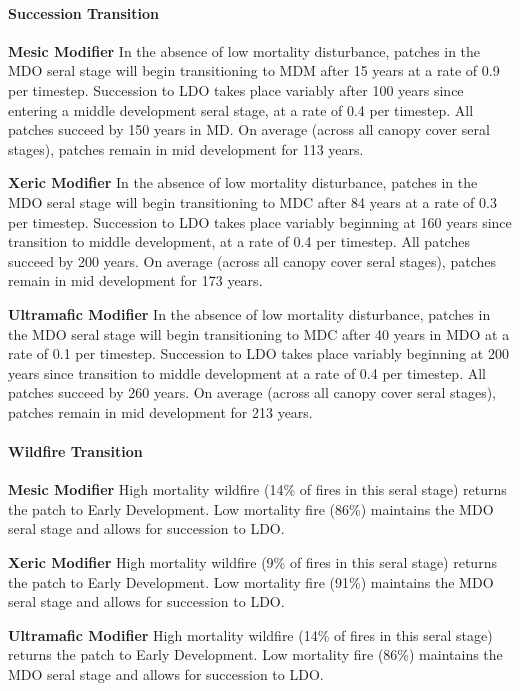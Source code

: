 \paragraph{Succession Transition}
\begin{adjustwidth}{2cm}{}
\textbf{Mesic Modifier } In the absence of low mortality disturbance, patches in the MDO seral stage will begin transitioning to MDM after 15 years at a rate of 0.9 per timestep. Succession to LDO takes place variably after 100 years since entering a middle development seral stage, at a rate of 0.4 per timestep. All patches succeed by 150 years in MD.  On average (across all canopy cover seral stages), patches remain in mid development for 113 years. 

\medskip
\noindent \textbf{Xeric Modifier} In the absence of low mortality disturbance, patches in the MDO seral stage will begin transitioning to MDC after 84 years at a rate of 0.3 per timestep. Succession to LDO takes place variably beginning at 160 years since transition to middle development, at a rate of 0.4 per timestep. All patches succeed by 200 years. On average (across all canopy cover seral stages), patches remain in mid development for 173 years.

\medskip
\noindent \textbf{Ultramafic Modifier} In the absence of low mortality disturbance, patches in the MDO seral stage will begin transitioning to MDC after 40 years in MDO at a rate of 0.1 per timestep. Succession to LDO takes place variably beginning at 200 years since transition to middle development at a rate of 0.4 per timestep. All patches succeed by 260 years. On average (across all canopy cover seral stages), patches remain in mid development for 213 years.

\end{adjustwidth}

\paragraph{Wildfire Transition}
\begin{adjustwidth}{2cm}{}
\textbf{Mesic Modifier } High mortality wildfire (14\% of fires in this seral stage) returns the patch to Early Development. Low mortality fire (86\%) maintains the MDO seral stage and allows for succession to LDO. 

\medskip
\noindent \textbf{Xeric Modifier}  High mortality wildfire (9\% of fires in this seral stage) returns the patch to Early Development. Low mortality fire (91\%) maintains the MDO seral stage and allows for succession to LDO. 

\medskip
\noindent \textbf{Ultramafic Modifier}  High mortality wildfire (14\% of fires in this seral stage) returns the patch to Early Development. Low mortality fire (86\%) maintains the MDO seral stage and allows for succession to LDO.

\end{adjustwidth}

